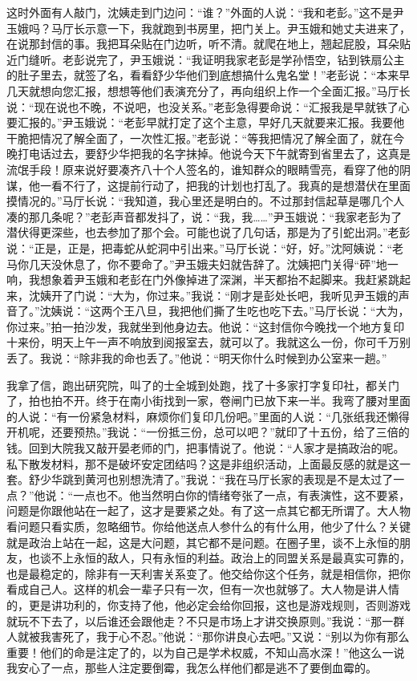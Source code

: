 \documentclass[12pt,oneside]{book}
\begin{document}
这时外面有人敲门，沈姨走到门边问：``谁？''外面的人说：``我和老彭。''这不是尹玉娥吗？马厅长示意一下，我就跑到书房里，把门关上。尹玉娥和她丈夫进来了，在说那封信的事。我把耳朵贴在门边听，听不清。就爬在地上，翘起屁股，耳朵贴近门缝听。老彭说完了，尹玉娥说：``我证明我家老彭是学孙悟空，钻到铁扇公主的肚子里去，就签了名，看看舒少华他们到底想搞什么鬼名堂！''老彭说：``本来早几天就想向您汇报，想想等他们表演充分了，再向组织上作一个全面汇报。''马厅长说：``现在说也不晚，不说吧，也没关系。''老彭急得要命说：``汇报我是早就铁了心要汇报的。''尹玉娥说：``老彭早就打定了这个主意，早好几天就要来汇报。我要他干脆把情况了解全面了，一次性汇报。''老彭说：``等我把情况了解全面了，就在今晚打电话过去，要舒少华把我的名字抹掉。他说今天下午就寄到省里去了，这真是流氓手段！原来说好要凑齐八十个人签名的，谁知群众的眼睛雪亮，看穿了他的阴谋，他一看不行了，这提前行动了，把我的计划也打乱了。我真的是想潜伏在里面摸情况的。''马厅长说：``我知道，我心里还是明白的。不过那封信起草是哪几个人凑的那几条呢？''老彭声音都发抖了，说：``我，我\ldots\ldots{}''尹玉娥说：``我家老彭为了潜伏得更深些，也去参加了那个会。可能也说了几句话，那是为了引蛇出洞。''老彭说：``正是，正是，把毒蛇从蛇洞中引出来。''马厅长说：``好，好。''沈阿姨说：``老马你几天没休息了，你不要命了。''尹玉娥夫妇就告辞了。沈姨把门关得``砰''地一响，我想象着尹玉娥和老彭在门外像掉进了深渊，半天都抬不起脚来。我赶紧跳起来，沈姨开了门说：``大为，你过来。''我说：``刚才是彭处长吧，我听见尹玉娥的声音了。''沈姨说：``这两个王八旦，我把他们撕了生吃也吃下去。''马厅长说：``大为，你过来。''拍一拍沙发，我就坐到他身边去。他说：``这封信你今晚找一个地方复印十来份，明天上午一声不响放到阅报室去，就可以了。我就这么一份，你可千万别丢了。我说：``除非我的命也丢了。''他说：``明天你什么时候到办公室来一趟。''

我拿了信，跑出研究院，叫了的士全城到处跑，找了十多家打字复印社，都关门了，拍也拍不开。终于在南小街找到一家，卷闸门已放下来一半。我弯了腰对里面的人说：``有一份紧急材料，麻烦你们复印几份吧。''里面的人说：``几张纸我还懒得开机呢，还要预热。''我说：``一份抵三份，总可以吧？''就印了十五份，给了三倍的钱。回到大院我又敲开晏老师的门，把事情说了。他说：``人家才是搞政治的呢。私下散发材料，那不是破坏安定团结吗？这是非组织活动，上面最反感的就是这一套。舒少华跳到黄河也别想洗清了。''我说：``我在马厅长家的表现是不是太过了一点？''他说：``一点也不。他当然明白你的情绪夸张了一点，有表演性，这不要紧，问题是你跟他站在一起了，这才是要紧之处。有了这一点其它都无所谓了。大人物看问题只看实质，忽略细节。你给他送点人参什么的有什么用，他少了什么？关键就是政治上站在一起，这是大问题，其它都不是问题。在圈子里，谈不上永恒的朋友，也谈不上永恒的敌人，只有永恒的利益。政治上的同盟关系是最真实可靠的，也是最稳定的，除非有一天利害关系变了。他交给你这个任务，就是相信你，把你看成自己人。这样的机会一辈子只有一次，但有一次也就够了。大人物是讲人情的，更是讲功利的，你支持了他，他必定会给你回报，这也是游戏规则，否则游戏就玩不下去了，以后谁还会跟他走？不只是市场上才讲交换原则。''我说：``那一群人就被我害死了，我于心不忍。''他说：``那你讲良心去吧。''又说：``别以为你有那么重要！他们的命是注定了的，以为自己是学术权威，不知山高水深！''他这么一说我安心了一点，那些人注定要倒霉，我怎么样他们都是逃不了要倒血霉的。
\end{document}

